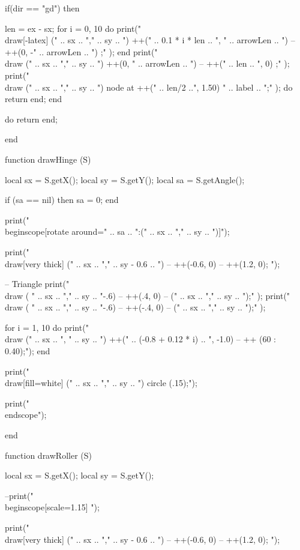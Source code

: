 \begin{luacode}
	
	if(dir == "gd") then
		
		len = ex - sx;
		for i = 0, 10 do
			print("\\draw[-latex] (" .. sx .. "," .. sy .. ") ++(" .. 0.1 * i * len .. ", " .. arrowLen .. ") -- ++(0, -" .. arrowLen .. ") ;" );
		end
		print("\\draw (" .. sx .. "," .. sy .. ") ++(0, " .. arrowLen .. ") -- ++(" .. len .. ", 0) ;" );
		print("\\draw (" .. sx .. "," .. sy .. ") node at ++(" .. len/2 ..", 1.50) {" .. label .. "};" );
		do return end;
	end
	
	do return end;
	
end


function drawHinge (S)

	local sx = S.getX();
	local sy = S.getY();
	local sa = S.getAngle();
	
	if (sa == nil) then sa = 0; end
	
	print("\\begin{scope}[rotate around={" .. sa .. ":(" .. sx .. "," .. sy  .. ")}]");
	
		print("\\draw[very thick] (" .. sx .. "," .. sy - 0.6 .. ") -- ++(-0.6, 0) -- ++(1.2, 0); ");
		
		-- Triangle
		print("\\draw ( " .. sx .. "," .. sy .. "-.6) -- ++(.4, 0) -- (" .. sx .. "," ..  sy .. ");" );
		print("\\draw ( " .. sx .. "," .. sy .. "-.6) -- ++(-.4, 0) -- (" .. sx .. "," ..  sy .. ");" );
		
		for i = 1, 10 do
			print("\\draw (" .. sx ..  ", " ..  sy .. ") ++(" .. (-0.8 + 0.12 * i) .. ", -1.0) -- ++ (60 : 0.40);");
		end
		
		print("\\draw[fill=white] (" .. sx .. "," .. sy .. ") circle (.15);");
		
	print("\\end{scope}");
	
end


function drawRoller (S)

	local sx = S.getX();
	local sy = S.getY();
	
	--print("\\begin{scope}[scale=1.15] ");
	
		print("\\draw[very thick] (" .. sx .. "," .. sy - 0.6 .. ") -- ++(-0.6, 0) -- ++(1.2, 0); ");
		

\end{luacode}
